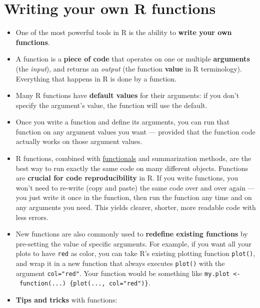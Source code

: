 \documentclass[
]{book}
\providecommand{\tightlist}{%
  \setlength{\itemsep}{0pt}\setlength{\parskip}{0pt}}
\begin{document}
\hypertarget{functions}{%
\section{Writing your own R functions}\label{functions}}

\begin{itemize}
\tightlist
\item
  One of the most powerful tools in R is the ability to \textbf{write your own functions}.
\item
  A function is a \textbf{piece of code} that operates on one or multiple \textbf{arguments} (the \emph{input}), and returns an \emph{output} (the function \textbf{value} in R terminology). Everything that happens in R is done by a function.
\item
  Many R functions have \textbf{default values} for their arguments: if you don't specify the argument's value, the function will use the default.
\item
  Once you write a function and define its arguments, you can run that function on any argument values you want --- provided that the function code actually works on those argument values.
\item
  R functions, combined with \href{https://adv-r.hadley.nz/functionals.html}{functionals} and summarization methods, are the best way to run exactly the same code on many different objects. Functions are \textbf{crucial for code reproducibility} in R. If you write functions, you won't need to re-write (copy and paste) the same code over and over again --- you just write it once in the function, then run the function any time and on any arguments you need. This yields clearer, shorter, more readable code with less errors.
\item
  New functions are also commonly used to \textbf{redefine existing functions} by pre-setting the value of specific arguments. For example, if you want all your plots to have \texttt{red} as color, you can take R's existing plotting function \texttt{plot()}, and wrap it in a new function that always executes \texttt{plot()} with the argument \texttt{col="red"}. Your function would be something like \texttt{my.plot\ \textless{}-\ function(...)\ \{plot(...,\ col="red")\}}.
\item
  \textbf{Tips and tricks} with functions:


\end{itemize}
\end{document}
